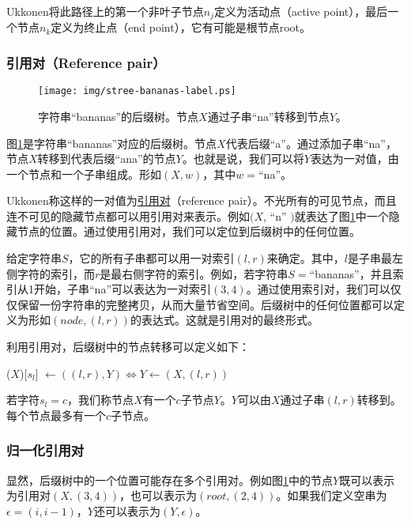\documentclass[UTF8]{article}
\begin{document}
Ukkonen将此路径上的第一个非叶子节点$n_j$定义为活动点（active point），最后一个节点$n_k$定义为终止点（end point），它有可能是根节点root。

\subsubsection{引用对（Reference pair）}

\begin{figure}[htbp]
  \centering
  \texttt{[image: img/stree-bananas-label.ps]}
  \caption{字符串“bananas”的后缀树。节点$X$通过子串“na”转移到节点$Y$。}
  \label{fig:stree-bananas-label}
\end{figure}

图\ref{fig:stree-bananas-label}是字符串“bananas”对应的后缀树。节点$X$代表后缀“a”。通过添加子串“na”，节点$X$转移到代表后缀“ana”的节点$Y$。也就是说，我们可以将$Y$表达为一对值，由一个节点和一个子串组成。形如$(X, w)$，其中$w=$“na”。

Ukkonen称这样的一对值为\underline{引用对}（reference pair）。不光所有的可见节点，而且连不可见的隐藏节点都可以用引用对来表示。例如$(X$, “n” $)$就表达了图\ref{fig:stree-bananas-label}中一个隐藏节点的位置。通过使用引用对，我们可以定位到后缀树中的任何位置。

给定字符串$S$，它的所有子串都可以用一对索引$(l, r)$来确定。其中，$l$是子串最左侧字符的索引，而$r$是最右侧字符的索引。例如，若字符串$S=$“bananas”，并且索引从1开始，子串“na”可以表达为一对索引$(3, 4)$。通过使用索引对，我们可以仅仅保留一份字符串的完整拷贝，从而大量节省空间。后缀树中的任何位置都可以定义为形如$(node, (l, r))$的表达式。这就是引用对的最终形式。

利用引用对，后缀树中的节点转移可以定义如下：

($X$)[$s_l$] $\gets ((l, r), Y) \iff Y \gets (X, (l, r))$

若字符$s_l=c$，我们称节点$X$有一个$c$子节点$Y$。$Y$可以由$X$通过子串$(l, r)$转移到。每个节点最多有一个$c$子节点。

\subsubsection{归一化引用对}

显然，后缀树中的一个位置可能存在多个引用对。例如图\ref{fig:stree-bananas-label}中的节点$Y$既可以表示为引用对$(X, (3, 4))$，也可以表示为$(root, (2, 4))$。如果我们定义空串为$\epsilon=(i, i-1)$，$Y$还可以表示为$(Y, \epsilon)$。
\end{document}
